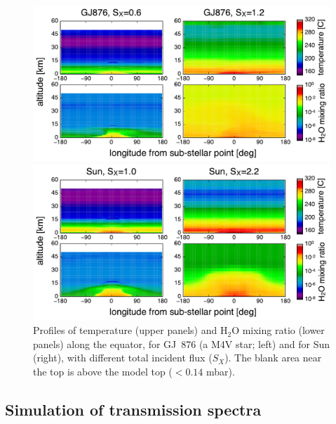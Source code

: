 \documentclass[11pt,numberedappendix,twocolappendix,]{emulateapj}
\def\water{H$_2$O }
\begin{document}
\begin{figure}[tb]
    \begin{minipage}{0.5\hsize}
\includegraphics[width=\hsize]{fig/AqOH0TLS_GJ876_temp_xH2O.pdf}
    \end{minipage}
    \begin{minipage}{0.5\hsize}
\includegraphics[width=\hsize]{fig/AqOH0TLS_Sun_temp_xH2O.pdf}
    \end{minipage}
    \caption{Profiles of temperature (upper panels) and \water mixing ratio (lower panels) along the equator, for GJ~876 (a M4V star; left) and for Sun (right), with different total incident flux ($S_X$). The blank area near the top is above the model top ($< 0.14$ mbar).}
\label{fig:3Dprofile_equator}
\end{figure}


\subsection{Simulation of transmission spectra}
\label{ss:method_TransmissionSpectra}
\end{document}
